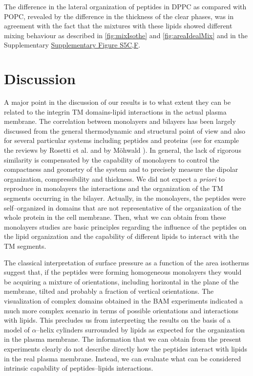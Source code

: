 \documentclass[journal=jacsat,manuscript=article]{achemso}
\begin{document}
The difference in the lateral organization of peptides in DPPC as compared with POPC, revealed by the difference in the thickness of the clear phases, was in agreement with the fact that the mixtures with these lipids showed different mixing behaviour as described in \autoref{fig:mixIsothe} and \autoref{fig:areaIdealMix} and in the Supplementary \hyperref[sec:support]{Supplementary Figure S5C,F}.

\section{Discussion}\label{sec:discu}

A major point in the discussion of our results is to what extent they can be related to the integrin TM domains-lipid interactions in the actual plasma membrane. The correlation between monolayers and bilayers has been largely discussed from the general thermodynamic and structural point of view and also for several particular systems including peptides and proteins (see for example the reviews by Rosetti et al. \cite{2008_Rosetti} and by Möhwald \cite{1990_Mohwald}). In general, the lack of rigorous similarity is compensated by the capability of monolayers to control the compactness and geometry of the system and to precisely measure the dipolar organization, compressibility and thickness. We did not expect a \textit{priori} to reproduce in monolayers the interactions and the organization of the TM segments occurring in the bilayer. Actually, in the monolayers, the peptides were self–organized in domains that are not representative of the organization of the whole protein in the cell membrane. Then, what we can obtain from these monolayers studies are basic principles regarding the influence of the peptides on the lipid organization and the capability of different lipids to interact with the TM segments.

The classical interpretation of surface pressure as a function of the area isotherms suggest that, if the peptides were forming homogeneous monolayers they would be acquiring a mixture of orientations, including horizontal in the plane of the membrane, tilted and probably a fraction of vertical orientations. The visualization of complex domains obtained in the BAM experiments indicated a much more complex scenario in terms of possible orientations and interactions with lipids. This precludes us from interpreting the results on the basis of a model of $\alpha$–helix cylinders surrounded by lipids as expected for the organization in the plasma membrane. The information that we can obtain from the present experiments clearly do not describe directly how the peptides interact with lipids in the real plasma membrane. Instead, we can evaluate what can be considered intrinsic capability of peptides–lipids interactions.
\end{document}
